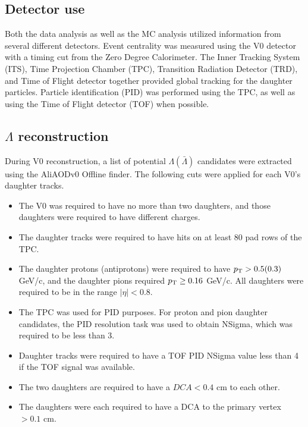 \subsection{Detector use}
Both the data analysis as well as the MC analysis utilized information from several different detectors.  Event centrality was measured using the V0 detector with a timing cut from the Zero Degree Calorimeter.  The Inner Tracking System (ITS), Time Projection Chamber (TPC), Transition Radiation Detector (TRD), and Time of Flight detector together provided global tracking for the daughter particles.  Particle identification (PID) was performed using the TPC, as well as using the Time of Flight detector (TOF) when possible.

\subsection{$\Lambda$ reconstruction}
\label{sec:Recon}

During V0 reconstruction, a list of potential $\Lambda(\bar{\Lambda})$ candidates were extracted using the AliAODv0 Offline finder. The following cuts were applied for each V0's daughter tracks.

\begin{itemize}
\item The V0 was required to have no more than two daughters, and those daughters were required to have different charges.
\item The daughter tracks were required to have hits on at least 80 pad rows of the TPC.
\item The daughter protons (antiprotons) were required to have $p_{\rm T} > 0.5 (0.3)$ GeV/c, and the daughter pions required $p_{\rm T} \geq 0.16$ GeV/c.  All daughters were required to be in the range $|\eta| < 0.8$.
\item The TPC was used for PID purposes.  For proton and pion daughter candidates, the PID resolution task was used to obtain NSigma, which was required to be less than 3.
\item Daughter tracks were required to have a TOF PID NSigma value less than 4 if the TOF signal was available.
\item The two daughters are required to have a $DCA < 0.4$ cm to each other.
\item The daughters were each required to have a DCA to the primary vertex $> 0.1$ cm.
\end{itemize}

